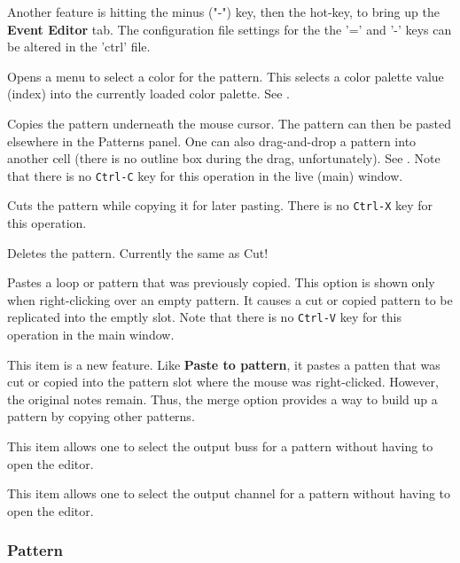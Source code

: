    Another feature is hitting the minus
   ("-") key, then the hot-key, to bring up the \textbf{Event Editor} tab.
   The configuration file settings for the the '=' and
   '-' keys can be altered in the 'ctrl' file.

   Opens a menu to select a color for the pattern.  This selects a color
   palette value (index) into the currently loaded color palette.
   See .

   Copies the pattern underneath the mouse cursor.
   The pattern can then be pasted elsewhere in the Patterns panel.
   One can also drag-and-drop a pattern into another cell (there is no outline
   box during the drag, unfortunately).
   See .
   Note that there is no \texttt{Ctrl-C} key for this operation in the
   live (main) window.

   Cuts the pattern while copying it for later pasting.
   There is no \texttt{Ctrl-X} key for this operation.

   Deletes the pattern.  Currently the same as Cut!

   Pastes a loop or pattern that was previously copied.
   This option is shown only when right-clicking over an empty pattern.
   It causes a cut or copied pattern to be replicated into the emptly slot.
   Note that there is no \texttt{Ctrl-V} key for this operation in the
   main window.

   This item is a new feature.  Like \textbf{Paste to pattern}, it pastes a
   patten that was cut or copied into the pattern slot where the mouse was
   right-clicked.  However, the original notes remain.  Thus, the merge
   option provides a way to build up a pattern by copying other patterns.

   This item allows one to select the output buss for a pattern without having
   to open the editor.

   This item allows one to select the output channel for a pattern without
   having to open the editor.
   
\subsubsection{Pattern}
\label{subsubsec:patterns_pattern_filled}

